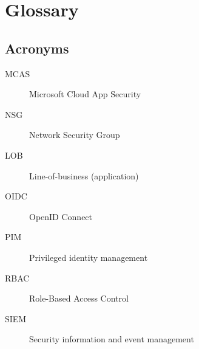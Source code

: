 \section{Glossary}
\subsection{Acronyms}
\begin{description}
	\item[MCAS] Microsoft Cloud App Security
	\item[NSG] Network Security Group
	\item[LOB] Line-of-business (application)
	\item[OIDC] OpenID Connect
	\item[PIM] Privileged identity management
	\item[RBAC] Role-Based Access Control 
	\item[SIEM] Security information and event management
\end{description}
